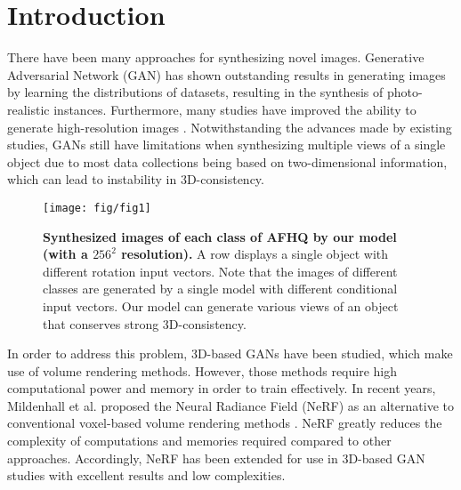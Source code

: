 \documentclass[nohyperref]{article}
\theoremstyle{plain}
\theoremstyle{definition}
\theoremstyle{remark}
\begin{document}
\section{Introduction}
\label{introduction}
There have been many approaches \cite{VAE, pixel_rnn} for synthesizing novel images. Generative Adversarial Network (GAN) \cite{gan} has shown outstanding results in generating images by learning the distributions of datasets, resulting in the synthesis of photo-realistic instances. Furthermore, many studies have improved the ability to generate high-resolution images \cite{chen2016infogan, karras2017progressive, karras2020analyzing, choi2018stargan}. Notwithstanding the advances made by existing studies, GANs still have limitations when synthesizing multiple views of a single object due to most data collections being based on two-dimensional information, which can lead to instability in 3D-consistency. 


\begin{figure}[t]
\begin{center}
\centerline{\texttt{[image: fig/fig1]}}
\caption{\textbf{Synthesized images of each class of AFHQ by our model (with a $256^{2}$ resolution).} A row displays a single object with different rotation input vectors. Note that the images of different classes are generated by a single model with different conditional input vectors. Our model can generate various views of an object that conserves strong 3D-consistency.}
\label{figure_1}
\end{center}
\vskip -0.2in
\end{figure}



In order to address this problem, 3D-based GANs \cite{wu2016learning, nguyen2019hologan, nguyen2020blockgan} have been studied, which make use of volume rendering methods. However, those methods require high computational power and memory in order to train effectively. In recent years, Mildenhall et al.  proposed the Neural Radiance Field (NeRF) as an alternative to conventional voxel-based volume rendering methods \cite{kajiya1984ray, drebin1988volume, henzler2019escaping}. NeRF greatly reduces the complexity of computations and memories required compared to other approaches. Accordingly, NeRF has been extended for use in 3D-based GAN studies \cite{schwarz2020graf, niemeyer2021giraffe, chan2021pi, deng2022gram} with excellent results and low complexities. 
\end{document}
